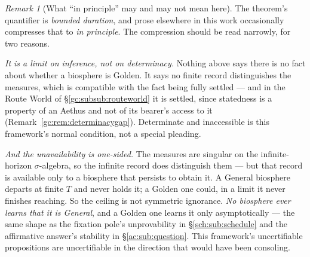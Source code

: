 \documentclass[11pt]{article}
\numberwithin{equation}{section}
\theoremstyle{plain}
\theoremstyle{definition}
\theoremstyle{remark}
\newtheorem{remark}[theorem]{Remark}
\begin{document}
\begin{remark}[What ``in principle'' may and may not mean here]
\label{gr:rem:ceilingscope}
The theorem's quantifier is \emph{bounded duration}, and prose elsewhere
in this work occasionally compresses that to \emph{in principle}. The
compression should be read narrowly, for two reasons.

\emph{It is a limit on inference, not on determinacy.} Nothing above says
there is no fact about whether a biosphere is Golden. It says no finite
record distinguishes the measures, which is compatible with the fact
being fully settled --- and in the Route World of
\S\ref{gc:subsub:routeworld} it is settled, since statedness is a
property of an Aethus and not of its bearer's access to it
(Remark~\ref{gc:rem:determinacygap}). Determinate and inaccessible is
this framework's normal condition, not a special pleading.

\emph{And the unavailability is one-sided.} The measures are singular on
the infinite-horizon $\sigma$-algebra, so the infinite record does
distinguish them --- but that record is available only to a biosphere
that persists to obtain it. A General biosphere departs at finite $T$ and
never holds it; a Golden one could, in a limit it never finishes
reaching. So the ceiling is not symmetric ignorance. \emph{No biosphere
ever learns that it is General}, and a Golden one learns it only
asymptotically --- the same shape as the fixation pole's unprovability in
\S\ref{sch:sub:schedule} and the affirmative answer's stability in
\S\ref{ac:sub:question}. This framework's uncertifiable propositions are
uncertifiable in the direction that would have been consoling.
\end{remark}
\end{document}

